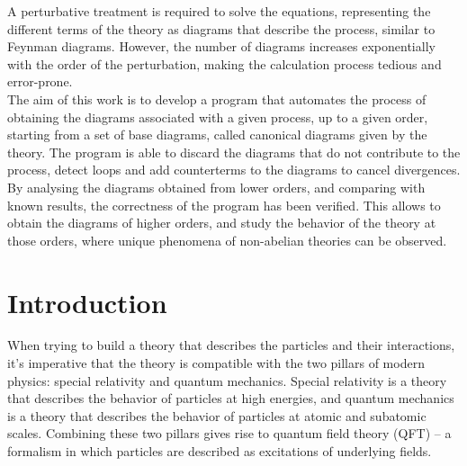 \documentclass[11pt,a4paper,twoside,pdf]{article}
\numberwithin{equation}{section}
\begin{document}
\begin{center}
\begin{minipage}{0.8\linewidth}
A perturbative treatment is required to solve the equations, representing the different
terms of the theory as diagrams that describe the process, similar to Feynman diagrams.
However, the number of diagrams increases exponentially with the order of the perturbation,
making the calculation process tedious and error-prone. \\

The aim of this work is to develop a program that automates the process of
obtaining the diagrams associated with a given process, up to a given order,
starting from a set of base diagrams, called canonical diagrams given by the
theory. The program is able to discard the diagrams that do not contribute to the
process, detect loops and add counterterms to the diagrams to cancel divergences. \\

By analysing the diagrams obtained from lower orders, and comparing with known
results, the correctness of the program has been verified. This allows to obtain
the diagrams of higher orders, and study the behavior of the theory at those
orders, where unique phenomena of non-abelian theories can be observed.

\end{minipage}

\newpage

\end{center}


\pagestyle{empty}       %
\tableofcontents
\setcounter{page}{0}       %


\pagestyle{fancy}
\fancyhead[RO,LE]{\leftmark}
\fancyhead[LO,RE]{\thepage}
\fancyfoot{}

\newpage

\section{Introduction}

When trying to build a theory that describes the particles and their interactions, 
it's imperative that the theory is compatible with the two pillars of modern physics:
special relativity and quantum mechanics. Special relativity is a theory 
that describes the behavior of particles at high energies, and quantum 
mechanics is a theory that describes the behavior of particles at atomic and subatomic scales.
Combining these two pillars gives rise to quantum field theory (QFT) – a formalism 
in which particles are described as excitations of underlying fields.
\end{document}
